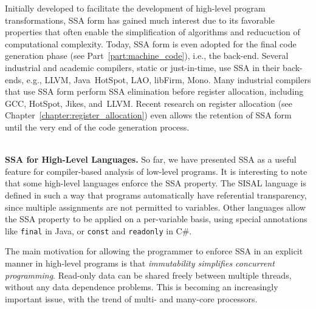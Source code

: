 

Initially developed to facilitate the development of high-level
program transformations, SSA form has gained much interest due to its
favorable properties that often
enable the simplification of algorithms and reducuction of computational complexity. 
Today, SSA form is even adopted for the final code generation phase (see Part~\ref{part:machine_code}), i.e., the back-end.
Several industrial and academic compilers, static or just-in-time, use SSA in their back-ends, e.g., LLVM, Java~HotSpot, LAO, libFirm, Mono.
Many industrial compilers that use SSA form perform SSA elimination before
register allocation, including  GCC, HotSpot, Jikes, and~LLVM.
Recent research on register allocation (see
Chapter~\ref{chapter:register_allocation}) even allows the retention of SSA form until the very end of the code generation process.

~\\
\textbf{SSA for High-Level Languages. }
So far, we have presented SSA as a useful feature for 
compiler-based analysis of low-level programs.
It is interesting to note that some high-level languages enforce
the SSA property.
The SISAL language is defined in such a way that
programs automatically have referential transparency, since
multiple assignments are not permitted to variables.
Other languages allow the SSA property to be
applied on a per-variable basis, using special annotations
like
\texttt{final} in Java, or 
\texttt{const} and \texttt{readonly} in C\#.

The main motivation for allowing the programmer to enforce
SSA in an explicit manner in high-level programs is that
\textit{immutability simplifies concurrent programming}.
Read-only data can be shared freely between multiple threads,
without any data dependence problems.
This is becoming an increasingly important issue, with the
trend of multi- and many-core processors.

